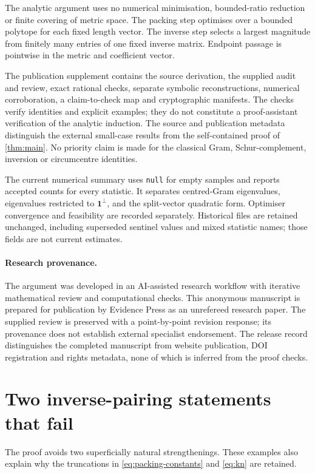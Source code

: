 \documentclass[11pt,a4paper]{article}
\theoremstyle{definition}
\theoremstyle{remark}
\numberwithin{equation}{section}
\newcommand{\one}{\mathbf 1}
\begin{document}
The analytic argument uses no numerical minimisation, bounded-ratio reduction or finite covering of metric space. The packing step optimises over a bounded polytope for each fixed length vector. The inverse step selects a largest magnitude from finitely many entries of one fixed inverse matrix. Endpoint passage is pointwise in the metric and coefficient vector.

The publication supplement contains the source derivation, the supplied audit and review, exact rational checks, separate symbolic reconstructions, numerical corroboration, a claim-to-check map and cryptographic manifests. The checks verify identities and explicit examples; they do not constitute a proof-assistant verification of the analytic induction. The source and publication metadata distinguish the external small-case results from the self-contained proof of \cref{thm:main}. No priority claim is made for the classical Gram, Schur-complement, inversion or circumcentre identities.

The current numerical summary uses \texttt{null} for empty samples and reports accepted counts for every statistic. It separates centred-Gram eigenvalues, eigenvalues restricted to $\one^\perp$, and the split-vector quadratic form. Optimiser convergence and feasibility are recorded separately. Historical files are retained unchanged, including superseded sentinel values and mixed statistic names; those fields are not current estimates.

\paragraph{Research provenance.}
The argument was developed in an AI-assisted research workflow with iterative mathematical review and computational checks. This anonymous manuscript is prepared for publication by Evidence Press as an unrefereed research paper. The supplied review is preserved with a point-by-point revision response; its provenance does not establish external specialist endorsement. The release record distinguishes the completed manuscript from website publication, DOI registration and rights metadata, none of which is inferred from the proof checks.

\appendix
\section{Two inverse-pairing statements that fail}\label{app:false}
The proof avoids two superficially natural strengthenings. These examples also explain why the truncations in \eqref{eq:packing-constants} and \eqref{eq:kn} are retained.
\end{document}

